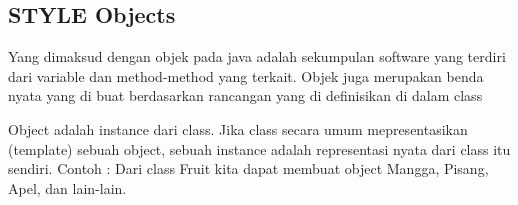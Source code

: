 \subsection{STYLE Objects}
Yang dimaksud dengan objek pada java adalah sekumpulan software yang terdiri dari variable dan method-method yang terkait. 
Objek juga merupakan benda nyata yang di buat berdasarkan rancangan yang di definisikan di dalam class

Object adalah instance dari class. Jika class secara umum mepresentasikan (template) sebuah object, 
sebuah instance adalah representasi nyata dari class itu sendiri. Contoh : Dari class Fruit kita dapat membuat object Mangga, 
Pisang, Apel, dan lain-lain.
